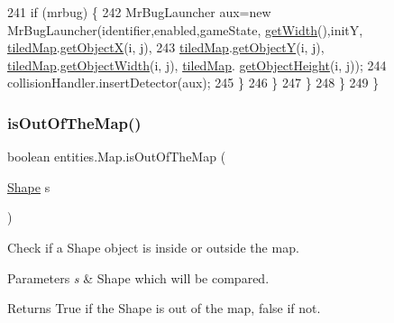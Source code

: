 \begin{DoxyCode}
241                     \textcolor{keywordflow}{if} (mrbug) \{
242                         MrBugLauncher aux=\textcolor{keyword}{new} MrBugLauncher(identifier,enabled,gameState,
      \mbox{\hyperlink{classentities_1_1_map_a7c15a6b2fac91bdb2592e1db1bc78623}{getWidth}}(),initY, \mbox{\hyperlink{classentities_1_1_map_a94a743ccd80946422fcbdb5ba1cc966b}{tiledMap}}.\mbox{\hyperlink{classorg_1_1newdawn_1_1slick_1_1tiled_1_1_tiled_map_a1f3254dc5845b361c2cbde74f587d4c1}{getObjectX}}(i, j),
243                                     \mbox{\hyperlink{classentities_1_1_map_a94a743ccd80946422fcbdb5ba1cc966b}{tiledMap}}.\mbox{\hyperlink{classorg_1_1newdawn_1_1slick_1_1tiled_1_1_tiled_map_a690410873e8b1ddcf677545432fb44f7}{getObjectY}}(i, j), 
      \mbox{\hyperlink{classentities_1_1_map_a94a743ccd80946422fcbdb5ba1cc966b}{tiledMap}}.\mbox{\hyperlink{classorg_1_1newdawn_1_1slick_1_1tiled_1_1_tiled_map_afa4bb340b71651c7ac0b0a372f22ab60}{getObjectWidth}}(i, j), \mbox{\hyperlink{classentities_1_1_map_a94a743ccd80946422fcbdb5ba1cc966b}{tiledMap}}.
      \mbox{\hyperlink{classorg_1_1newdawn_1_1slick_1_1tiled_1_1_tiled_map_a2da39e5d72913b52ebb5a12397724f96}{getObjectHeight}}(i, j));
244                         collisionHandler.insertDetector(aux);
245                     \}
246                 \}
247             \}
248         \}
249     \}
\end{DoxyCode}
\mbox{\label{classentities_1_1_map_ac0f565ccdac5df088ea9424a6c218b14}} 
\subsubsection{\texorpdfstring{is\+Out\+Of\+The\+Map()}{isOutOfTheMap()}}
{\footnotesize\ttfamily boolean entities.\+Map.\+is\+Out\+Of\+The\+Map (\begin{DoxyParamCaption}\item[{\mbox{\hyperlink{classorg_1_1newdawn_1_1slick_1_1geom_1_1_shape}{Shape}}}]{s }\end{DoxyParamCaption})\hspace{0.3cm}{\ttfamily [inline]}}

Check if a Shape object is inside or outside the map.


\begin{DoxyParams}{Parameters}
{\em s} & Shape which will be compared. \\
\hline
\end{DoxyParams}
\begin{DoxyReturn}{Returns}
True if the Shape is out of the map, false if not. 
\end{DoxyReturn}

